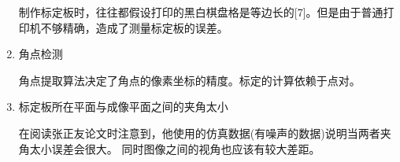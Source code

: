 \documentclass[UTF8]{ctexart}
\begin{document}
\begin{CJK*}{UTF8}{gbsn}
\begin{enumerate}[(1)]
    制作标定板时，往往都假设打印的黑白棋盘格是等边长的[7]。但是由于普通打印机不够精确，造成了测量标定板的误差。
    \item 角点检测
    
    角点提取算法决定了角点的像素坐标的精度。标定的计算依赖于点对。
    \item 标定板所在平面与成像平面之间的夹角太小
    
    在阅读张正友论文时注意到，他使用的仿真数据(有噪声的数据)说明当两者夹角太小误差会很大。
    同时图像之间的视角也应该有较大差距。
\end{enumerate}
\end{CJK*}
\end{document}
